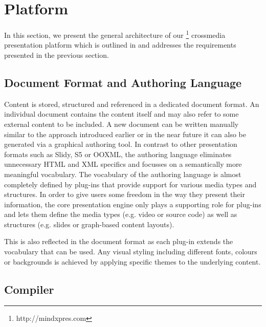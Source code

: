   \section{\mxp Platform}
   \label{mxp-platform}

   In this section, we present the general architecture of our
   \mxp\footnote{http://mindxpres.com} crossmedia presentation platform which
   is outlined in  and addresses the requirements
   presented in the previous section.


   \subsection{Document Format and Authoring Language}

    Content is stored, structured and referenced in a dedicated \mxp document
    format. An individual \mxp document contains the content itself and may
    also refer to some external content to be included. A new \mxp document can
    be written manually similar to the \latex approach introduced earlier or in
    the near future it can also be generated via a graphical authoring tool. In
    contrast to other presentation formats such as Slidy, S5 or OOXML, the
    authoring language eliminates unnecessary HTML and XML specifics and
    focusses on a semantically more meaningful vocabulary. The vocabulary of
    the authoring language is almost completely defined by plug-ins that
    provide support for various media types and structures. In order to give
    users some freedom in the way they present their information, the core \mxp
    presentation engine only plays a supporting role for plug-ins and lets them
    define the media types (e.g. video or source code) as well as structures
    (e.g. slides or graph-based content layouts).

    This is also reflected in the document format as each plug-in extends the
    vocabulary that can be used. Any visual styling including different fonts,
    colours or backgrounds is achieved by applying specific themes to the
    underlying content.

   \subsection{Compiler}

